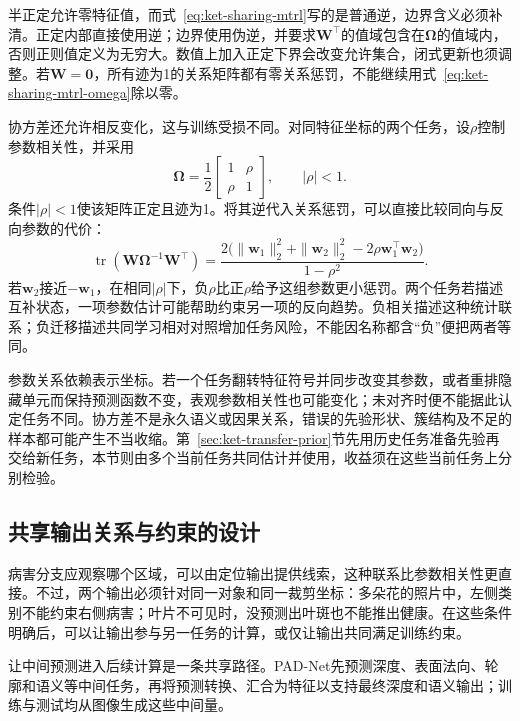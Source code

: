 半正定允许零特征值，而式~\eqref{eq:ket-sharing-mtrl}写的是普通逆，边界含义必须补清。正定内部直接使用逆；边界使用伪逆，并要求$\bm W^{\top}$的值域包含在$\bm\Omega$的值域内，否则正则值定义为无穷大。数值上加入正定下界会改变允许集合，闭式更新也须调整。若$\bm W=\bm0$，所有迹为1的关系矩阵都有零关系惩罚，不能继续用式~\eqref{eq:ket-sharing-mtrl-omega}除以零。

协方差还允许相反变化，这与训练受损不同。对同特征坐标的两个任务，设$\rho$控制参数相关性，并采用
\begin{equation}
  \bm\Omega=\frac12
  \begin{bmatrix}1&\rho\\\rho&1\end{bmatrix},
  \qquad |\rho|<1.
\end{equation}
条件$|\rho|<1$使该矩阵正定且迹为1。将其逆代入关系惩罚，可以直接比较同向与反向参数的代价：
\begin{equation}
  \operatorname{tr}(\bm W\bm\Omega^{-1}\bm W^{\top})
  =
  \frac{2\bigl(\|\bm w_1\|_2^2+\|\bm w_2\|_2^2
  -2\rho\bm w_1^{\top}\bm w_2\bigr)}
  {1-\rho^2}.
  \label{eq:ket-sharing-negative-correlation}
\end{equation}
若$\bm w_2$接近$-\bm w_1$，在相同$|\rho|$下，负$\rho$比正$\rho$给予这组参数更小惩罚。两个任务若描述互补状态，一项参数估计可能帮助约束另一项的反向趋势。负相关描述这种统计联系；负迁移描述共同学习相对对照增加任务风险，不能因名称都含“负”便把两者等同。

参数关系依赖表示坐标。若一个任务翻转特征符号并同步改变其参数，或者重排隐藏单元而保持预测函数不变，表观参数相关性也可能变化；未对齐时便不能据此认定任务不同。协方差不是永久语义或因果关系，错误的先验形状、簇结构及不足的样本都可能产生不当收缩。第~\ref{sec:ket-transfer-prior}节先用历史任务准备先验再交给新任务，本节则由多个当前任务共同估计并使用，收益须在这些当前任务上分别检验。

\subsection{共享输出关系与约束的设计}
\label{sec:ket-sharing-outputs}

病害分支应观察哪个区域，可以由定位输出提供线索，这种联系比参数相关性更直接。不过，两个输出必须针对同一对象和同一裁剪坐标：多朵花的照片中，左侧类别不能约束右侧病害；叶片不可见时，没预测出叶斑也不能推出健康。在这些条件明确后，可以让输出参与另一任务的计算，或仅让输出共同满足训练约束。

让中间预测进入后续计算是一条共享路径。PAD-Net先预测深度、表面法向、轮廓和语义等中间任务，再将预测转换、汇合为特征以支持最终深度和语义输出；训练与测试均从图像生成这些中间量。

